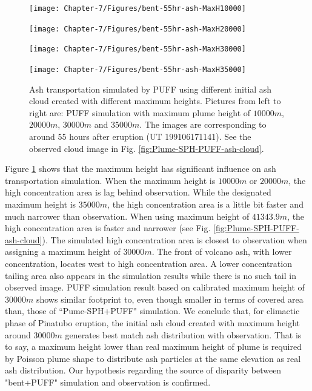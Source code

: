 \begin{figure}[!htb]
    \centering
    \begin{minipage}{.245\textwidth}
        \centering
        \texttt{[image: Chapter-7/Figures/bent-55hr-ash-MaxH10000]}
    \end{minipage}%
    \begin{minipage}{.245 \textwidth}
        \centering
        \texttt{[image: Chapter-7/Figures/bent-55hr-ash-MaxH20000]}
    \end{minipage}%
    \begin{minipage}{.245 \textwidth}
        \centering
        \texttt{[image: Chapter-7/Figures/bent-55hr-ash-MaxH30000]}
    \end{minipage}%
    \begin{minipage}{.245 \textwidth}
        \centering
        \texttt{[image: Chapter-7/Figures/bent-55hr-ash-MaxH35000]}
    \end{minipage}%
    \caption{Ash transportation simulated by PUFF using different initial ash cloud created with different maximum heights. Pictures from left to right are: PUFF simulation with maximum plume height of $10000 m$, $20000 m$, $30000 m$ and $35000 m$. The images are corresponding to around 55 hours after eruption (UT 199106171141).  See the observed cloud image in Fig. \ref{fig:Plume-SPH-PUFF-ash-cloud}.}
    \label{fig:Various-Maximum-height-Pinatubo-ash-cloud}
\end{figure}

Figure \ref{fig:Various-Maximum-height-Pinatubo-ash-cloud} shows that the maximum height has significant influence on ash transportation simulation. When the maximum height is $10000 m$ or $20000 m$, the high concentration area is lag behind observation. While the designated maximum height is $35000 m$, the high concentration area is a little bit faster and much narrower than observation. When using maximum height of $41343.9 m$, the high concentration area is faster and narrower (see Fig. \ref{fig:Plume-SPH-PUFF-ash-cloud}). The simulated high concentration area is closest to observation when assigning a maximum height of $30000 m$. The front of volcano ash, with lower concentration, locates west to high concentration area. A lower concentration tailing area also appears in the simulation results while there is no such tail in observed image. PUFF simulation result based on calibrated maximum height of $30000 m$ shows similar footprint to, even though smaller in terms of covered area than, those of ``Pume-SPH+PUFF" simulation. We conclude that, for climactic phase of Pinatubo eruption, the initial ash cloud created with maximum height around  $30000 m$ generates best match ash distribution with observation. That is to say, a maximum height lower than real maximum height of plume is required by Poisson plume shape to distribute ash particles at the same elevation as real ash distribution. Our hypothesis regarding the source of disparity between "bent+PUFF" simulation and observation is confirmed.


